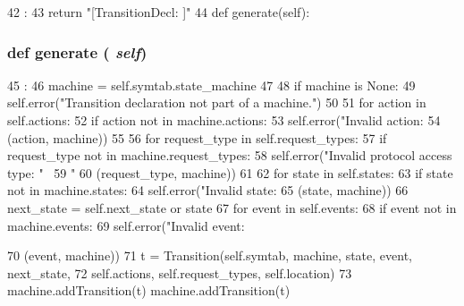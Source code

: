 \begin{DoxyCode}
42                       :
43         return "[TransitionDecl: ]"
44 
    def generate(self):
\end{DoxyCode}
\hypertarget{classslicc_1_1ast_1_1TransitionDeclAST_1_1TransitionDeclAST_a4555d1cee0dccf3942ea35fe86de2e8e}{
\subsubsection[{generate}]{\setlength{\rightskip}{0pt plus 5cm}def generate ( {\em self})}}
\label{classslicc_1_1ast_1_1TransitionDeclAST_1_1TransitionDeclAST_a4555d1cee0dccf3942ea35fe86de2e8e}



\begin{DoxyCode}
45                       :
46         machine = self.symtab.state_machine
47 
48         if machine is None:
49             self.error("Transition declaration not part of a machine.")
50 
51         for action in self.actions:
52             if action not in machine.actions:
53                 self.error("Invalid action: %
54                            (action, machine))
55 
56         for request_type in self.request_types:
57             if request_type not in machine.request_types:
58                 self.error("Invalid protocol access type: " \
59                            "%
60                            (request_type, machine))
61 
62         for state in self.states:
63             if state not in machine.states:
64                 self.error("Invalid state: %
65                            (state, machine))
66             next_state = self.next_state or state
67             for event in self.events:
68                 if event not in machine.events:
69                     self.error("Invalid event: %
      
70                                (event, machine))
71                 t = Transition(self.symtab, machine, state, event, next_state,
72                                self.actions, self.request_types, self.location)
73                 machine.addTransition(t)
                machine.addTransition(t)
\end{DoxyCode}


